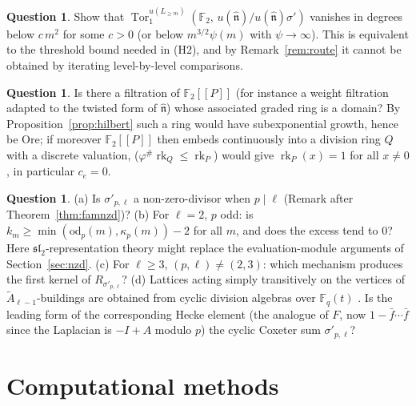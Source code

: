 \documentclass[11pt]{amsart}
\theoremstyle{definition}
\newtheorem{question}[theorem]{Question}
\newcommand{\F}{\mathbb{F}}
\newcommand{\rk}{\operatorname{rk}}
\newcommand{\hatn}{\widehat{\mathfrak n}}
\begin{document}
\begin{question}
Show that $\operatorname{Tor}_1^{u(L_{\ge m})}(\F_2,\,u(\hatn)/u(\hatn)\sigma')$ vanishes in degrees below $c\,m^2$ for
some $c>0$ (or below $m^{3/2}\psi(m)$ with $\psi\to\infty$). This is equivalent to the threshold bound needed in (H2), and
by Remark~\ref{rem:route} it cannot be obtained by iterating level-by-level comparisons.
\end{question}

\begin{question}
Is there a filtration of $\F_2[[P]]$ (for instance a weight filtration adapted to the twisted form of $\hatn$) whose
associated graded ring is a domain? By Proposition~\ref{prop:hilbert} such a ring would have subexponential growth,
hence be Ore; if moreover $\F_2[[P]]$ then embeds continuously into a division ring $Q$ with a discrete valuation,
\cite[Thm.~7.1]{JZS} ($\varphi^\#\rk_Q\le\rk_P$) would give $\rk_P(x)=1$ for all $x\ne0$, in particular $c_e=0$.
\end{question}

\begin{question}
(a) Is $\sigma'_{p,\ell}$ a non-zero-divisor when $p\mid\ell$ (Remark after Theorem~\ref{thm:famnzd})?
(b) For $\ell=2$, $p$ odd: is $k_m\ge\min(\mathrm{od}_p(m),\kappa_p(m))-2$ for all $m$, and does the excess tend to $0$?
Here $\mathfrak{sl}_2$-representation theory might replace the evaluation-module arguments of Section~\ref{sec:nzd}.
(c) For $\ell\ge3$, $(p,\ell)\ne(2,3)$: which mechanism produces the first kernel of $R_{\sigma'_{p,\ell}}$?
(d) Lattices acting simply transitively on the vertices of $\tilde A_{\ell-1}$-buildings are obtained from cyclic division
algebras over $\F_q(t)$ \cite{LSV}. Is the leading form of the corresponding Hecke element (the analogue of $F$, now
$1-\bar f\cdots\bar f$ since the Laplacian is $-I+A$ modulo $p$) the cyclic Coxeter sum $\sigma'_{p,\ell}$?
\end{question}

\appendix
\section{Computational methods}\label{app:comp}
\end{document}
